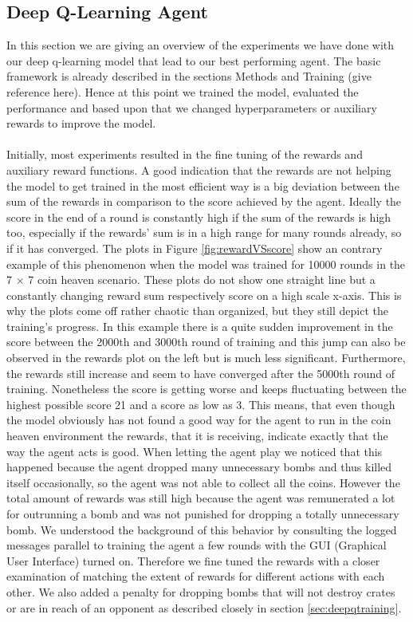 
\subsection{Deep Q-Learning Agent}

In this section we are giving an overview of the experiments we have done with our deep q-learning model that lead to our best performing agent. The basic framework is already described in the sections Methods and Training (give reference here). Hence at this point we trained the model, evaluated the performance and based upon that we changed hyperparameters or auxiliary rewards to improve the model.\\ \\
Initially, most experiments resulted in the fine tuning of the rewards and auxiliary reward functions. A good indication that the rewards are not helping the model to get trained in the most efficient way is a big deviation between the sum of the rewards in comparison to the score achieved by the agent. Ideally the score in the end of a round is constantly high if the sum of the rewards is high too, especially if the rewards' sum is in a high range for many rounds already, so if it has converged. The plots in Figure \ref{fig:rewardVSscore} show an contrary example of this phenomenon when the model was trained for 10000 rounds in the 7 $\times$ 7 coin heaven scenario. These plots do not show one straight line but a constantly changing reward sum respectively score on a high scale x-axis. This is why the plots come off rather chaotic than organized, but they still depict the training's progress. In this example there is a quite sudden improvement in the score between the 2000th and 3000th round of training and this jump can also be observed in the rewards plot on the left but is much less significant. Furthermore, the rewards still increase and seem to have converged after the 5000th round of training. Nonetheless the score is getting worse and keeps fluctuating between the highest possible score 21 and a score as low as 3. This means, that even though the model obviously has not found a good way for the agent to run in the coin heaven environment the rewards, that it is receiving, indicate exactly that the way the agent acts is good. When letting the agent play we noticed that this happened because the agent dropped many unnecessary bombs and thus killed itself occasionally, so the agent was not able to collect all the coins. However the total amount of rewards was still high because the agent was remunerated a lot for outrunning a bomb and was not punished for dropping a totally unnecessary bomb. We understood the background of this behavior by consulting the logged messages parallel to training the agent a few rounds with the GUI (Graphical User Interface) turned on. Therefore we fine tuned the rewards with a closer examination of matching the extent of rewards for different actions with each other. We also added a penalty for dropping bombs that will not destroy crates or are in reach of an opponent as described closely in section \ref{sec:deepqtraining}. 
